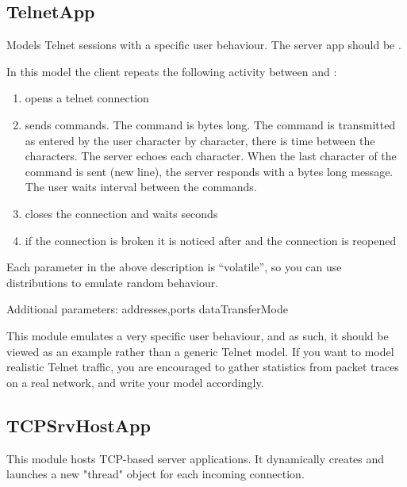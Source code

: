 \subsection{TelnetApp}

Models Telnet sessions with a specific user behaviour.
The server app should be .

In this model the client repeats the following activity
between  and :

\begin{enumerate}
\item opens a telnet connection
\item sends  commands. The command is  bytes
      long. The command is transmitted as entered by the user character by character,
      there is  time between the characters. The server echoes
      each character. When the last character of the command is sent (new line),
      the server responds with a  bytes long message.
      The user waits  interval between the commands.
\item closes the connection and waits  seconds
\item if the connection is broken it is noticed after 
      and the connection is reopened
\end{enumerate}

Each parameter in the above description is ``volatile'', so you can
use distributions to emulate random behaviour.

Additional parameters:
addresses,ports
dataTransferMode

\begin{note}
This module emulates a very specific user behaviour, and as such,
it should be viewed as an example rather than a generic Telnet model.
If you want to model realistic Telnet traffic, you are encouraged
to gather statistics from packet traces on a real network, and
write your model accordingly.
\end{note}

\subsection{TCPSrvHostApp}

This module hosts TCP-based server applications. It dynamically creates
and launches a new "thread" object for each incoming connection.

